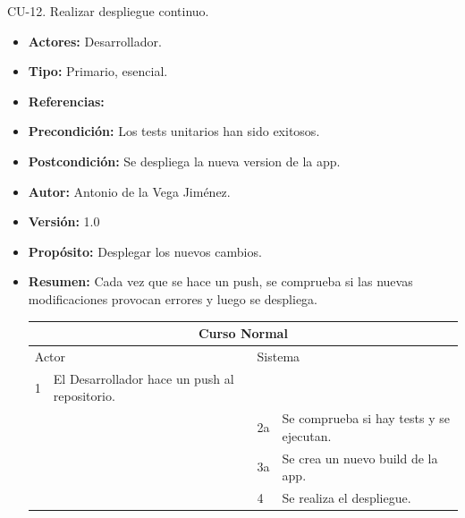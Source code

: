   \item CU-12. Realizar despliegue continuo.
\begin{itemize}
  \item \textbf{Actores:} Desarrollador.
  \item \textbf{Tipo:} Primario, esencial.
  \item \textbf{Referencias:}
  \item \textbf{Precondición:} Los tests unitarios han sido exitosos.
  \item \textbf{Postcondición:} Se despliega la nueva version de la app.
  \item \textbf{Autor:} Antonio de la Vega Jiménez.
  \item \textbf{Versión:} 1.0
  \item \textbf{Propósito:} Desplegar los nuevos cambios.
  \item \textbf{Resumen:} Cada vez que se hace un push, se comprueba si las nuevas modificaciones provocan errores y luego se despliega.
  \begin{table}[H]
    \centering
    \begin{tabularx}{\textwidth}{|l|X|l|X|}
      \hline
      \multicolumn{4}{|c|}{\cellcolor[HTML]{C0C0C0}Curso Normal}                                                 \\ \hline
      \multicolumn{2}{|l|}{\cellcolor[HTML]{EFEFEF}Actor} & \multicolumn{2}{l|}{\cellcolor[HTML]{EFEFEF}Sistema} \\ \hline
      1                         & El Desarrollador hace un push al repositorio.                        &                            &                         \\ \hline
                                &                         & 2a                          & Se comprueba si hay tests  y se ejecutan.                       \\ \hline
                                &                         & 3a                           & Se crea un nuevo build de la app.                       \\ \hline
                                &                         & 4                           & Se realiza el despliegue.                       \\ \hline


\end{tabularx}
\end{table}
\end{itemize}
